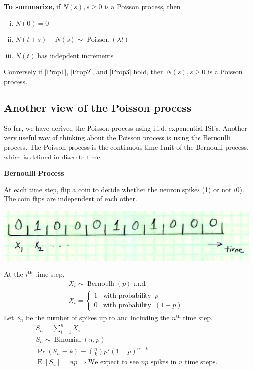 \documentclass[11pt]{article}
\DeclareMathOperator{\E}{E}
\DeclareMathOperator{\Poisson}{Poisson}
\DeclareMathOperator{\Bernoulli}{Bernoulli}
\DeclareMathOperator{\Binomial}{Binomial}
\newenvironment{propertybox}{%
   \def\FrameCommand{\colorbox{LightSteelBlue}}%
   \MakeFramed{\advance\hsize-\width \FrameRestore}}
 {\endMakeFramed}
\begin{document}
\begin{propertybox}
{\bf To summarize,} if $N(s), s\geq0$ is a Poisson process, then
\begin{enumerate}[(i)]
\item \label{Prop1} $N(0) = 0$
\item \label{Prop2} $N(t + s) - N(s) \sim \Poisson(\lambda t)$
\item \label{Prop3} $N(t)$ has indepdent increments
\end{enumerate}
Conversely if \ref{Prop1}, \ref{Prop2}, and \ref{Prop3} hold, then $N(s), s\geq0$ is a Poisson process.
\end{propertybox}

\subsection{Another view of the Poisson process}
So far, we have derived the Poisson process using i.i.d. exponential ISI's. Another very useful way of thinking about
the Poisson process is using the Bernoulli process. The Poisson process is the continuous-time limit of the Bernoulli
process, which is defined in discrete time.

{\bf Bernoulli Process}

At each time step, flip a coin to decide whether the neuron spikes (1) or not (0). The coin flips are independent of each
other.

\begin{center}
\includegraphics[scale=0.5]{Figure7.jpg}
\end{center}

At the $i^{\text{th}}$ time step,
\begin{gather*}
X_i \sim \Bernoulli (p) \text{ i.i.d.} \\
X_i = \begin{cases} 1 & \text{with probability }  \, p \\ 0 & \text{with probability }  \, (1-p) \end{cases}
\end{gather*}
Let $S_n$ be the number of spikes up to and including the $n^{\text{th}}$ time step.
\begin{gather*}
S_n = \sum_{i=1}^n X_i \\
S_n \sim \Binomial(n,p) \\
\Pr(S_n = k) = \binom{n}{k} p^k \left(1-p\right)^{n-k} \\
\E[S_n] = np \Rightarrow \text{We expect to see $n p$ spikes in $n$ time steps.}
\end{gather*}
\end{document}
